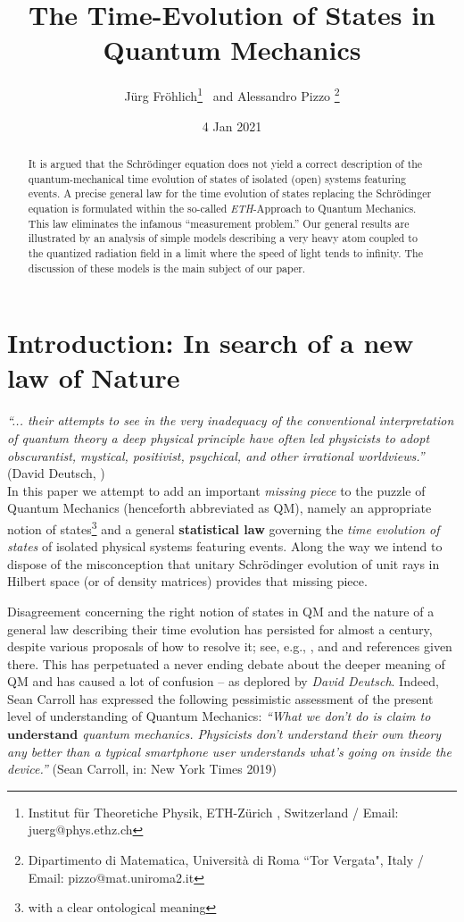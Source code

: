\documentclass[12pt]{article}
\date{4 Jan 2021}
\author{J\"{u}rg Fr\"{o}hlich\footnote{Institut f\"ur Theoretiche Physik, ETH-Z\"urich , Switzerland / Email: juerg@phys.ethz.ch}\,\,\, and Alessandro Pizzo \footnote{Dipartimento di Matematica, Universit\`a di Roma ``Tor Vergata", Italy
/ Email: pizzo@mat.uniroma2.it}}
\title{The Time-Evolution of States in Quantum Mechanics}
\begin{document}
\maketitle


\begin{abstract}
It is argued that the Schr\"odinger equation does not yield a correct description of the quantum-mechanical time evolution of states of isolated (open) systems featuring events. A precise general law for the time evolution of states replacing the Schr\"odinger equation is formulated within the so-called \textit{ETH}-Approach to Quantum Mechanics. This law eliminates the infamous ``measurement problem.'' Our general results are illustrated by an analysis of simple models describing a very heavy atom coupled to the quantized radiation field in a limit where the speed of light tends to infinity. The discussion of these models is the main subject of our paper.
\end{abstract}

\newpage
\tableofcontents
\newpage

\section{Introduction: In search of a new law of Nature}\label{Intro}

\hspace{0.5cm} \textit{``... their attempts to see in the very inadequacy of the conventional interpretation of quantum theory a 
deep physical principle have often led physicists to adopt obscurantist, mystical, positivist, psychical, and other irrational 
worldviews.''} (David Deutsch, \cite{Deutsch})\\

In this paper we attempt to add an important \textit{missing piece} to the puzzle of Quantum Mechanics (henceforth 
abbreviated as QM), namely an appropriate notion of states\footnote{with a clear ontological meaning} and a general {\bf{statistical law}} governing the \textit{time evolution of states} of isolated physical systems featuring events. Along the way we intend to dispose of the misconception 
that unitary Schr\"odinger evolution of unit rays in Hilbert space (or of density matrices) provides that missing piece.

Disagreement concerning the right notion of states in QM and the nature of a general law describing their time evolution 
has persisted for almost a century, despite various proposals of how to resolve it; see, e.g., \cite{Bohm, GRW, Everett}, 
and \cite{Bell, ABDZ} and references given there. This has perpetuated a never ending debate about the deeper meaning 
of QM and has caused a lot of confusion -- as deplored by \textit{David Deutsch}. 
Indeed, {Sean Carroll} has expressed the following pessimistic assessment of the present level 
of understanding of Quantum Mechanics: \textit{``What we don't do is claim to $\mathbf{understand}$ 
quantum mechanics. Physicists don't understand their own theory any better than a typical smartphone 
user understands what's going on inside the device.''} (Sean Carroll, in: New York Times 2019)   
\end{document}
